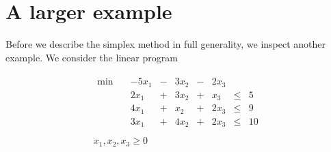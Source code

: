 \section{A larger example}
\label{sec:larger-example}

Before we describe the simplex method in full generality, we inspect
another example. We consider the linear program 


\begin{equation}
\label{simpleq:44}
  \begin{array}{c}
  \begin{matrix}
    \min \quad &  -5x_1 & - &  3 x_2 & - & 2 x_3 & &    \\
        & 2x_1 &+& 3x_2 &+& x_3 &\leq&5 \\
        & 4x_1 &+& x_2 &+& 2x_3 &\leq& 9 \\
        & 3 x_1 &+& 4 x_2 &+& 2 x_3 &\leq& 10 \\

       \end{matrix}\\
       x_1,x_2,x_3\geq0
\end{array}
\end{equation}

